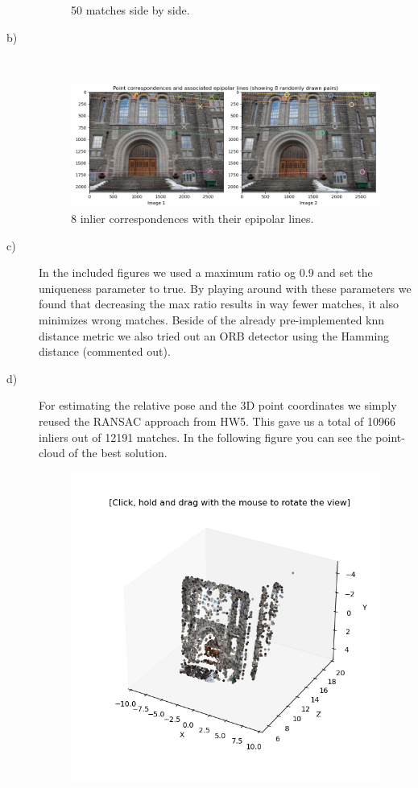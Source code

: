 \documentclass[a4paper]{article} %
\begin{document}
\begin{description}
\begin{figure}[H]
                \caption{50 matches side by side.}
                \end{figure}
        \item [b)]  \hfill \\
            \begin{figure}[H]
                \center
                \includegraphics[width= \linewidth]{epipolarLines}
                \caption{8 inlier correspondences with their epipolar lines.}
            \end{figure}
        \item [c)]  In the included figures we used a maximum ratio og 0.9 and set the uniqueness parameter to true.
                    By playing around with these parameters we found that decreasing the max ratio results in way fewer matches, it also minimizes wrong matches.
                    Beside of the already pre-implemented knn distance metric we also tried out an ORB detector using the Hamming distance (commented out).
        \item [d)]  For estimating the relative pose and the 3D point coordinates we simply reused the RANSAC approach from HW5.
                    This gave us a total of 10966 inliers out of 12191 matches.
                    In the following figure you can see the point-cloud of the best solution.
            \begin{figure}[h]
                \center
                \includegraphics[width= 0.7 \linewidth ]{3D_point_cloud}

\end{figure}
\end{description}
\end{document}
